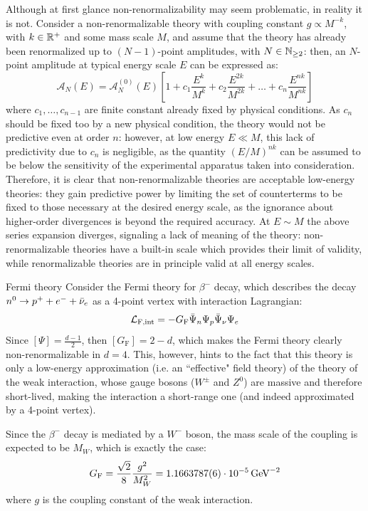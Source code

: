 Although at first glance non-renormalizability may seem problematic, in reality it is not. Consider a non-renormalizable theory with coupling constant $ g \propto M^{-k} $, with $ k \in \mathbb{R}^+ $ and some mass scale $ M $, and assume that the theory has already been renormalized up to $ (N - 1) $-point amplitudes, with $ N \in \mathbb{N}_{\ge 2} $: then, an $ N $-point amplitude at typical energy scale $ E $ can be expressed as:
\begin{equation*}
  \mathcal{A}_N(E) = \mathcal{A}^{(0)}_N(E) \left[ 1 + c_1 \frac{E^k}{M^k} + c_2 \frac{E^{2k}}{M^{2k}} + \dots + c_n \frac{E^{nk}}{M^{nk}} \right]
\end{equation*}
where $ c_1, \dots, c_{n-1} $ are finite constant already fixed by physical conditions.
As $ c_n $ should be fixed too by a new physical condition, the theory would not be predictive even at order $ n $: however, at low energy $ E \ll M $, this lack of predictivity due to $ c_n $ is negligible, as the quantity $ (E/M)^{nk} $ can be assumed to be below the sensitivity of the experimental apparatus taken into consideration. Therefore, it is clear that non-renormalizable theories are acceptable low-energy theories: they gain predictive power by limiting the set of counterterms to be fixed to those necessary at the desired energy scale, as the ignorance about higher-order divergences is beyond the required accuracy. At $ E \sim M $ the above series expansion diverges, signaling a lack of meaning of the theory: non-renormalizable theories have a built-in scale which provides their limit of validity, while renormalizable theories are in principle valid at all energy scales.

\begin{example}{Fermi theory}{}
  Consider the Fermi theory for $ \beta^- $ decay, which describes the decay $ n^0 \rightarrow p^+ + e^- + \bar{\nu}_e $ as a 4-point vertex with interaction Lagrangian:
  \begin{equation}
    \mathcal{L}_\text{F,int} = - G_\text{F} \bar{\Psi}_n \Psi_p \bar{\Psi}_\nu \Psi_e
  \end{equation}
  Since $ [\Psi] = \frac{d - 1}{2} $, then $ [G_\text{F}] = 2 - d $, which makes the Fermi theory clearly non-renormalizable in $ d = 4 $. This, however, hints to the fact that this theory is only a low-energy approximation (i.e. an ``effective" field theory) of the theory of the weak interaction, whose gauge bosons ($ W^\pm $ and $ Z^0 $) are massive and therefore short-lived, making the interaction a short-range one (and indeed approximated by a 4-point vertex).

  Since the $ \beta^- $ decay is mediated by a $ W^- $ boson, the mass scale of the coupling is expected to be $ M_W $, which is exactly the case:
  \begin{equation*}
    G_\text{F} = \frac{\sqrt{2}}{8} \frac{g^2}{M_W^2} = 1.1663787(6) \cdot 10^{-5} \,\mathrm{GeV}^{-2}
  \end{equation*}
  where $ g $ is the coupling constant of the weak interaction.
\end{example}

